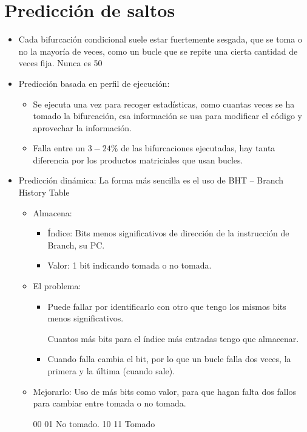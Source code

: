 \documentclass[12pt, twoside, openright]{report} %
\begin{document}
\section{Predicción de saltos}

\begin{itemize}
\item Cada bifurcación condicional suele estar fuertemente sesgada, que se toma o no la mayoría de veces, como un bucle que se repite una cierta cantidad de veces fija. Nunca es 50%
\item Predicción basada en perfil de ejecución:
\begin{itemize}
  \item Se ejecuta una vez para recoger estadísticas, como cuantas veces se ha tomado la bifurcación, esa información se usa para modificar el código y aprovechar la información.
  \item Falla entre un $3-24\%$ de las bifurcaciones ejecutadas, hay tanta diferencia por los productos matriciales que usan bucles.
\end{itemize}
    
\item Predicción dinámica: La forma más sencilla es el uso de BHT – Branch History Table
\begin{itemize}
  \item Almacena:
  \begin{itemize}
    \item Índice: Bits menos significativos de dirección de la instrucción de Branch, su PC.
    \item Valor: 1 bit indicando tomada o no tomada.
  \end{itemize}
  
  \item El problema:
  \begin{itemize}
    \item Puede fallar por identificarlo con otro que tengo los mismos bits menos significativos.
    
    Cuantos más bits para el índice más entradas tengo que almacenar.
    \item Cuando falla cambia el bit, por lo que un bucle falla dos veces, la primera y la última (cuando sale).
  \end{itemize}
  
  \item Mejorarlo: Uso de más bits como valor, para que hagan falta dos fallos para cambiar entre tomada o no tomada.
  
  00 01 No tomado. 10 11 Tomado
  

\end{itemize}
\end{itemize}
\end{document}
